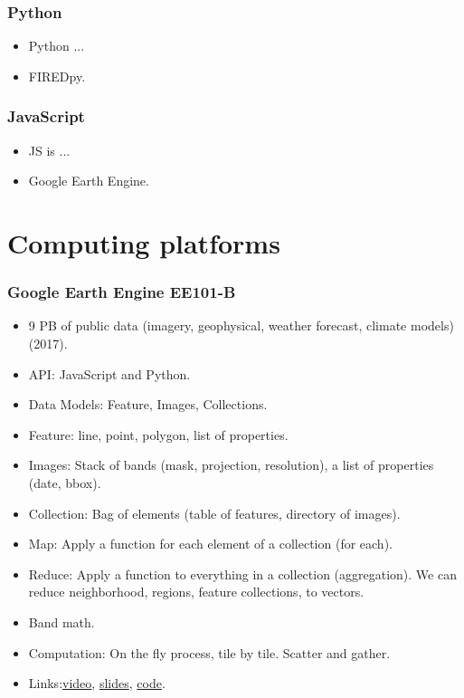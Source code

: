 \documentclass{beamer}
\begin{document}
\begin{frame}
    \frametitle{Python}
    \begin{itemize}
        \item Python ...
        \item FIREDpy.
    \end{itemize}
\end{frame}

\begin{frame}
    \frametitle{JavaScript}
    \begin{itemize}
        \item JS is ...
        \item Google Earth Engine.
    \end{itemize}
\end{frame}



\section{Computing platforms}

\begin{frame}[t, allowframebreaks]
    \frametitle{Google Earth Engine EE101-B}
    \begin{itemize}
        \item 9 PB of public data (imagery, geophysical, weather forecast, 
            climate models) (2017).
        \item API: JavaScript and Python.
        \item Data Models: Feature,  Images, Collections.
        \item Feature: line, point, polygon, list of properties.
        \item Images: Stack of bands (mask, projection, resolution), a list of 
            properties (date, bbox).
            \item Collection: Bag of elements (table of features, directory of
            images).
        \item Map: Apply a function for each element of a collection (for each).
        \item Reduce: Apply a function to everything in a collection 
            (aggregation). We can reduce neighborhood, regions, feature 
            collections, to vectors.
        \item Band math.
        \item Computation: On the fly process, tile by tile. Scatter and 
            gather.
        \item Links:\href{https://youtu.be/m1ejxSi3l8s}{video}, 
            \href{goo.gl/ZUqPXz}{slides},
            \href{goo.gl/01kki0}{code}.
    \end{itemize}
\end{frame}
\end{document}
